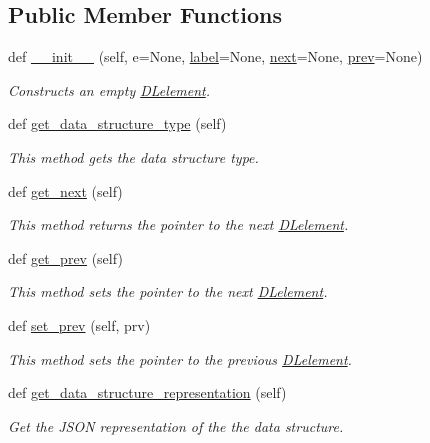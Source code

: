 \subsection*{Public Member Functions}
\begin{DoxyCompactItemize}
\item 
def \mbox{\hyperlink{classbridges_1_1dl__element_1_1_d_lelement_a4c78a2c1aebf91783fb73e3909b1267f}{\+\_\+\+\_\+init\+\_\+\+\_\+}} (self, e=None, \mbox{\hyperlink{classbridges_1_1element_1_1_element_a97551dbb005cd5d1f13b65461290c6e3}{label}}=None, \mbox{\hyperlink{classbridges_1_1sl__element_1_1_s_lelement_a4fa8e9321dd2ce726da047ddc64adabf}{next}}=None, \mbox{\hyperlink{classbridges_1_1dl__element_1_1_d_lelement_a90ac125877c6733ee7f0181ce19e02df}{prev}}=None)
\begin{DoxyCompactList}\small\item\em Constructs an empty \mbox{\hyperlink{classbridges_1_1dl__element_1_1_d_lelement}{D\+Lelement}}. \end{DoxyCompactList}\item 
def \mbox{\hyperlink{classbridges_1_1dl__element_1_1_d_lelement_a5fb177ed67b75e606ac303f7a972d301}{get\+\_\+data\+\_\+structure\+\_\+type}} (self)
\begin{DoxyCompactList}\small\item\em This method gets the data structure type. \end{DoxyCompactList}\item 
def \mbox{\hyperlink{classbridges_1_1dl__element_1_1_d_lelement_a268ae3965f0cba4a801e73f61b7c9fcc}{get\+\_\+next}} (self)
\begin{DoxyCompactList}\small\item\em This method returns the pointer to the next \mbox{\hyperlink{classbridges_1_1dl__element_1_1_d_lelement}{D\+Lelement}}. \end{DoxyCompactList}\item 
def \mbox{\hyperlink{classbridges_1_1dl__element_1_1_d_lelement_ab27fc6bf6e583eef2c8c9f021a3a9ad0}{get\+\_\+prev}} (self)
\begin{DoxyCompactList}\small\item\em This method sets the pointer to the next \mbox{\hyperlink{classbridges_1_1dl__element_1_1_d_lelement}{D\+Lelement}}. \end{DoxyCompactList}\item 
def \mbox{\hyperlink{classbridges_1_1dl__element_1_1_d_lelement_ad8697b336305478e1a9f6a3850fd2cb2}{set\+\_\+prev}} (self, prv)
\begin{DoxyCompactList}\small\item\em This method sets the pointer to the previous \mbox{\hyperlink{classbridges_1_1dl__element_1_1_d_lelement}{D\+Lelement}}. \end{DoxyCompactList}\item 
def \mbox{\hyperlink{classbridges_1_1dl__element_1_1_d_lelement_abcae653ca8e9590c594910bad148ddf2}{get\+\_\+data\+\_\+structure\+\_\+representation}} (self)
\begin{DoxyCompactList}\small\item\em Get the J\+S\+ON representation of the the data structure. \end{DoxyCompactList}\end{DoxyCompactItemize}
